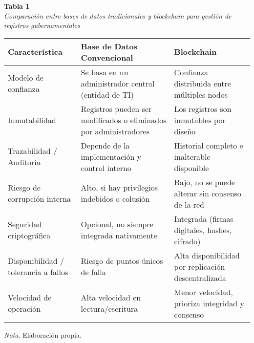 \begin{table}[htbp]
    \begin{flushleft}
        \textbf{Tabla 1}\\
        \textit{Comparación entre bases de datos tradicionales y blockchain para gestión de registros gubernamentales}
    \end{flushleft}
    \centering
    \begin{tabular}{|p{4.5cm}|p{5.2cm}|p{5.2cm}|}
    \hline
    \textbf{Característica} & \textbf{Base de Datos Convencional} & \textbf{Blockchain} \\
    \hline
    Modelo de confianza & Se basa en un administrador central (entidad de TI) & Confianza distribuida entre múltiples nodos \\
    \hline
    Inmutabilidad & Registros pueden ser modificados o eliminados por administradores & Los registros son inmutables por diseño \\
    \hline
    Trazabilidad / Auditoría & Depende de la implementación y control interno & Historial completo e inalterable disponible \\
    \hline
    Riesgo de corrupción interna & Alto, si hay privilegios indebidos o colusión & Bajo, no se puede alterar sin consenso de la red \\
    \hline
    Seguridad criptográfica & Opcional, no siempre integrada nativamente & Integrada (firmas digitales, hashes, cifrado) \\
    \hline
    Disponibilidad / tolerancia a fallos & Riesgo de puntos únicos de falla & Alta disponibilidad por replicación descentralizada \\
    \hline
    Velocidad de operación & Alta velocidad en lectura/escritura & Menor velocidad, prioriza integridad y consenso \\
    \hline
    \end{tabular}
    \vspace{0.5em}
    \begin{flushleft}
        \textit{Nota.} Elaboración propia.
    \end{flushleft}
    \label{tab:comparacion_bd_blockchain}
\end{table} 